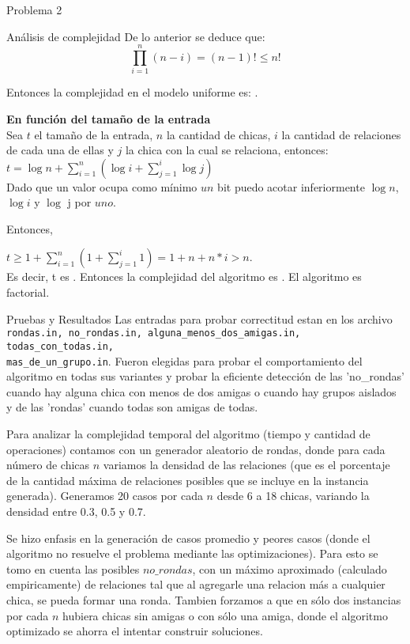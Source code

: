 \begin{section}{Problema 2}
\begin{subsection}{Análisis de complejidad}
			De lo anterior se deduce que: $$\displaystyle\prod_{i=1}^n (n-i) = (n-1)! \leq n!$$

			Entonces la complejidad en el modelo uniforme es:  .\VSP
		
			\noindent\textbf{En función del tamaño de la entrada}\\

				Sea $t$ el tamaño de la entrada, $n$ la cantidad de chicas, $i$ la cantidad de relaciones de cada una de ellas y $j$ la chica con la cual se relaciona, entonces:\\
				
				$t=\log n + \sum_{i=1}^n (\log i + \sum_{j=1}^i \log j)$\\
				
				Dado que un valor ocupa como mínimo $un$ bit puedo acotar inferiormente $\log n$, $\log i$ y $\log$ j por $uno$.
				
				Entonces,
				
				$t \geq 1 + \sum_{i=1}^n (1 + \sum_{j=1}^i 1)=1 + n + n*i > n$.\\
				
				
				Es decir, t es . Entonces la complejidad del algoritmo es . El algoritmo es factorial.
	\end{subsection}

	\begin{subsection}{Pruebas y Resultados}
		Las entradas para probar correctitud estan en los archivo \texttt{rondas.in, no\_rondas.in, alguna\_menos\_dos\_amigas.in, todas\_con\_todas.in, \\
		mas\_de\_un\_grupo.in}.
		Fueron elegidas para probar el comportamiento del algoritmo en todas sus variantes y probar la eficiente detección de las 'no\_rondas' cuando hay alguna chica con menos de dos amigas o cuando hay grupos aislados y de las 'rondas' cuando todas son amigas de todas.
		
		Para analizar la complejidad temporal del algoritmo (tiempo y cantidad de operaciones) contamos con un generador aleatorio de rondas, donde para cada número de chicas $n$ variamos la densidad de las relaciones (que es el porcentaje de la cantidad máxima de relaciones posibles que se incluye en la instancia generada). Generamos 20 casos por cada $n$ desde 6 a 18 chicas, variando la densidad entre 0.3, 0.5 y 0.7.

		 Se hizo enfasis en la generación de casos promedio y peores casos (donde el algoritmo no resuelve el problema mediante las optimizaciones). Para esto se tomo en cuenta las posibles $no\_rondas$, con un máximo aproximado (calculado empiricamente) de relaciones tal que al agregarle una relacion más a cualquier chica, se pueda formar una ronda. Tambien forzamos a que en sólo dos instancias por cada $n$ hubiera chicas sin amigas o con sólo una amiga, donde el algoritmo optimizado se ahorra el intentar construir soluciones.
		

\end{subsection}
\end{section}
